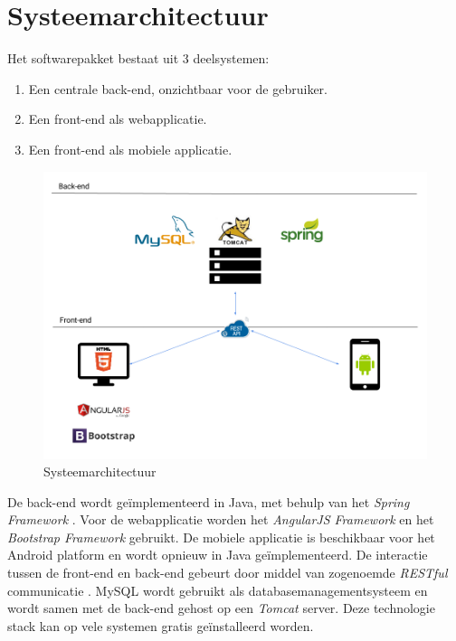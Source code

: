 \documentclass[a4paper]{article}
\begin{document}
\section{Systeemarchitectuur}  \label{sec:systeemarchitectuur} %
Het softwarepakket bestaat uit 3 deelsystemen:

\begin{enumerate}
    \item Een centrale back-end, onzichtbaar voor de gebruiker.
    \item Een front-end als webapplicatie.
    \item Een front-end als mobiele applicatie.
\end{enumerate}

\begin{figure}[H]
  \includegraphics[width=\textwidth]{technologie_stack}
  \caption{Systeemarchitectuur}
  \label{fig:Systeemarchitectuur}
\end{figure}

De back-end wordt geïmplementeerd in Java, met behulp van het \textit{Spring Framework} \cite{Spring}. Voor de webapplicatie worden het \textit{AngularJS Framework} \cite{AngularJS} en het \textit{Bootstrap Framework} \cite{Bootstrap} gebruikt. De mobiele applicatie is beschikbaar voor het Android platform en wordt opnieuw in Java geïmplementeerd. De interactie tussen de front-end en back-end gebeurt door middel van zogenoemde \textit{RESTful} communicatie \cite{REST}. MySQL \cite{MySQL} wordt gebruikt als databasemanagementsysteem en wordt samen met de back-end gehost op een \textit{Tomcat} \cite{Tomcat} server. Deze technologie stack kan op vele systemen gratis geïnstalleerd worden.
\end{document}
